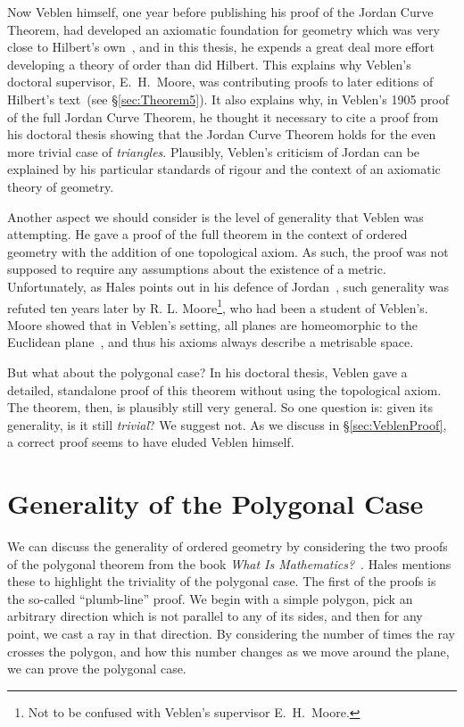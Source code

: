 Now Veblen himself, one year before publishing his proof of the Jordan Curve Theorem, had developed an axiomatic foundation for geometry which was very close to Hilbert's own~\cite{Veblenphd}, and in this thesis, he expends a great deal more effort developing a theory of order than did Hilbert. This explains why Veblen's doctoral supervisor, E.~H.~Moore, was contributing proofs to later editions of Hilbert's text~(see \S\ref{sec:Theorem5}). It also explains why, in Veblen's 1905 proof of the full Jordan Curve Theorem, he thought it necessary to cite a proof from his doctoral thesis showing that the Jordan Curve Theorem holds for the even more trivial case of \emph{triangles}. Plausibly, Veblen's criticism of Jordan can be explained by his particular standards of rigour and the context of an axiomatic theory of geometry. 

Another aspect we should consider is the level of generality that Veblen was attempting. He gave a proof of the full theorem in the context of ordered geometry with the addition of one topological axiom. As such, the proof was not supposed to require any assumptions about the existence of a metric. Unfortunately, as Hales points out in his defence of Jordan~\cite{HalesJordansProof}, such generality was refuted ten years later by R. L. Moore\footnote{Not to be confused with Veblen's supervisor E.~H.~Moore.}, who had been a student of Veblen's. %
Moore showed that in Veblen's setting, all planes are homeomorphic to the Euclidean plane~\cite{MooreSitus}, and thus his axioms always describe a metrisable space.

But what about the polygonal case? In his doctoral thesis, Veblen gave a detailed, standalone proof of this theorem without using the topological axiom. The theorem, then, is plausibly still very general. So one question is: given its generality, is it still \emph{trivial}? We suggest not. As we discuss in \S\ref{sec:VeblenProof}, a correct proof seems to have eluded Veblen himself.

\section{Generality of the Polygonal Case}\label{sec:JordanCurveGenerality}
We can discuss the generality of ordered geometry by considering the two proofs of the polygonal theorem from the book \emph{What Is Mathematics?}~\cite{WhatIsMathematics}. Hales mentions these to highlight the triviality of the polygonal case. The first of the proofs is the so-called ``plumb-line'' proof. We begin with a simple polygon, pick an arbitrary direction which is not parallel to any of its sides, and then for any point, we cast a ray in that direction. By considering the number of times the ray crosses the polygon, and how this number changes as we move around the plane, we can prove the polygonal case.

